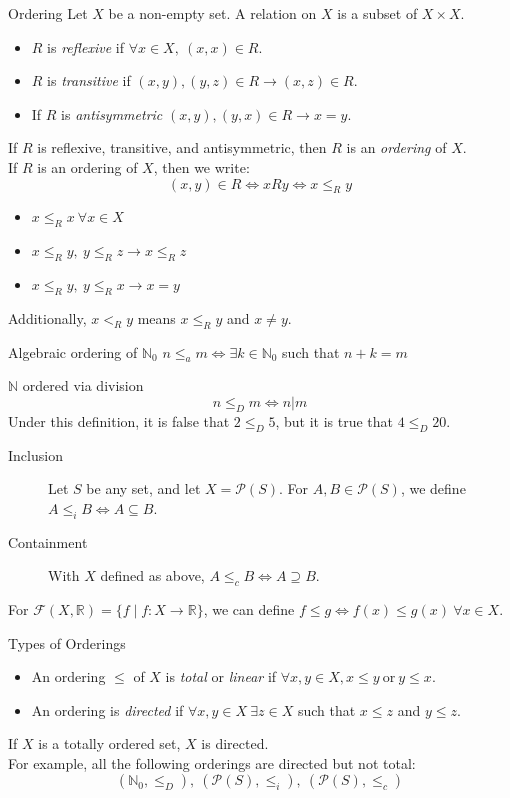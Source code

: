 \documentclass[8pt]{extarticle}
\newcommand{\N}{\mathbb{N}}
\newcommand{\R}{\mathbb{R}}
\begin{document}
  \begin{problem}{Ordering}
    Let $X$ be a non-empty set. A relation on $X$ is a subset of $X\times X$.
    \begin{itemize}
      \item $R$ is \textit{reflexive} if $\forall x\in X,~(x,x)\in R$.
      \item $R$ is \textit{transitive} if $(x,y),(y,z)\in R \rightarrow (x,z)\in R$.
      \item If $R$ is \textit{antisymmetric} $(x,y),(y,x)\in R\rightarrow x=y$. 
    \end{itemize}
    If $R$ is reflexive, transitive, and antisymmetric, then $R$ is an \textit{ordering} of $X$.\\

    If $R$ is an ordering of $X$, then we write:
    \[
      (x,y)\in R \Leftrightarrow xRy \Leftrightarrow x\leq_{R} y
    \] 
    \begin{itemize}
      \item $x\leq_{R}x~\forall x\in X$
      \item $x\leq_R y,~y\leq_R z \rightarrow x\leq_R z$
      \item $x\leq_R y,~y\leq_R x \rightarrow x=y$
    \end{itemize}
    Additionally, $x<_R y$ means $x\leq_R y$ and $x\neq y$.
    \begin{problem}{Algebraic ordering of $\N_0$}
      $n\leq_a m\Leftrightarrow \exists k\in \N_0$ such that $n+k = m$
    \end{problem}
    \begin{problem}{$\N$ ordered via division}
      $$n\leq_D m \Leftrightarrow n|m$$
      Under this definition, it is false that $2\leq_D 5$, but it is true that $4\leq_D 20$.
    \end{problem}
    \begin{description}
      \item[Inclusion] Let $S$ be any set, and let $X = \mathcal{P}(S)$. For $A,B\in \mathcal{P}(S)$, we define $A\leq_i B \Leftrightarrow A\subseteq B$.
      \item[Containment] With $X$ defined as above, $A\leq_c B\Leftrightarrow A\supseteq B$.
    \end{description}
    For $\mathcal{F}(X,\R) = \{f\mid f:X\rightarrow\R\}$, we can define $f\leq g\Leftrightarrow f(x)\leq g(x)~\forall x\in X$.
  \end{problem}
  \begin{problem}{Types of Orderings}
    \begin{itemize}
      \item An ordering $\leq$ of $X$ is \textit{total} or \textit{linear} if $\forall x,y\in X, x\leq y~\text{or}~y\leq x$. 
      \item An ordering is \textit{directed} if $\forall x,y\in X~\exists z\in X$ such that $x\leq z$ and $y\leq z$.
    \end{itemize}
    If $X$ is a totally ordered set, $X$ is directed.\\

    For example, all the following orderings are directed but not total:
    \[
      (\N_0,\leq_D),~(\mathcal{P}(S),\leq_i),~(\mathcal{P}(S),\leq_c)
    \] 
  \end{problem}
\end{document}

